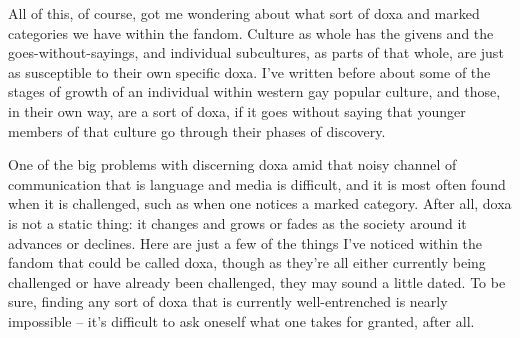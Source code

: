 All of this, of course, got me wondering about what sort of doxa and marked categories we have within the fandom.  Culture as whole has the givens and the goes-without-sayings, and individual subcultures, as parts of that whole, are just as susceptible to their own specific doxa.  I’ve written before about some of the stages of growth of an individual within western gay popular culture, and those, in their own way, are a sort of doxa, if it goes without saying that younger members of that culture go through their phases of discovery.

One of the big problems with discerning doxa amid that noisy channel of communication that is language and media is difficult, and it is most often found when it is challenged, such as when one notices a marked category.  After all, doxa is not a static thing: it changes and grows or fades as the society around it advances or declines.  Here are just a few of the things I’ve noticed within the fandom that could be called doxa, though as they’re all either currently being challenged or have already been challenged, they may sound a little dated.  To be sure, finding any sort of doxa that is currently well-entrenched is nearly impossible -- it’s difficult to ask oneself what one takes for granted, after all.


